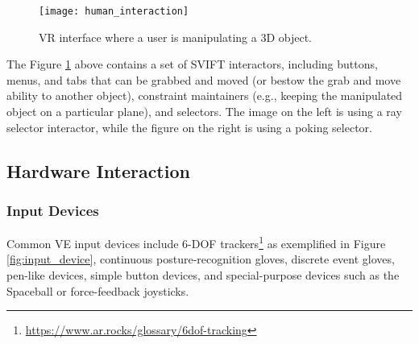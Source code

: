 \begin{figure}[h!]
    \centering
    \texttt{[image: human\_interaction]}
    \caption{\gls{VR} interface where a user is manipulating a \gls{3D} object.~\cite{hale2014handbook}} %
    \label{fig:human_interaction}
\end{figure}
\FloatBarrier




The Figure \ref{fig:human_interaction} above contains a set of \gls{SVIFT} interactors, including buttons, menus, and tabs
that can be grabbed and moved (or bestow the grab and move ability to another object), constraint maintainers 
(e.g., keeping the manipulated object on a particular plane), and selectors. The image on the left is using a 
ray selector interactor, while the figure on the right is using a poking selector.


\subsection{Hardware Interaction}
\label{sec:hardware_interaction}

\subsubsection{Input Devices}
\label{sec:input_devices}

Common \gls{VE} input devices include \gls{6-DOF} trackers\footnote{\url{https://www.ar.rocks/glossary/6dof-tracking}} as exemplified in Figure \ref{fig:input_device}, continuous posture-recognition gloves, discrete 
event gloves, pen-like devices, simple button devices, and special-purpose devices such as the 
Spaceball or force-feedback joysticks. 

